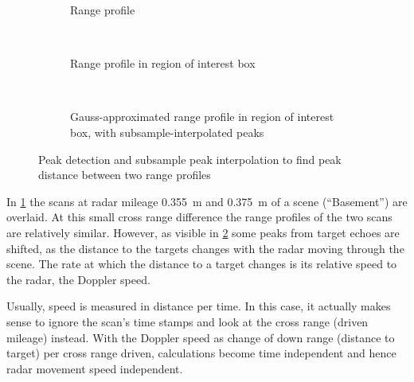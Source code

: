 \begin{figure}[htbp]
    \centering
    \begin{subfigure}[t]{\textwidth}
        \def\svgscale{1}
        
        \caption{Range profile}
        \label{fig:explain_peak_gradient_1}
    \end{subfigure}\bigskip\\
    \begin{subfigure}[t]{\textwidth}
        \def\svgscale{1}
        
        \caption{Range profile in region of interest box}
        \label{fig:explain_peak_gradient_2}
    \end{subfigure}\bigskip\\
    \begin{subfigure}[t]{\textwidth}
        \def\svgscale{1}
        
        \caption{Gauss-approximated range profile in region of interest box, with subsample-interpolated peaks}
        \label{fig:explain_peak_gradient_3}
    \end{subfigure}\bigskip
    \caption{Peak detection and subsample peak interpolation to find peak distance between two range profiles}
    \label{fig:fig_explain_peak_gradient}
\end{figure}

In \cref{fig:explain_peak_gradient_1} the scans at radar mileage \SI{0.355}{m} and \SI{0.375}{m} of a scene (``Basement'') are overlaid. At this small cross range difference the range profiles of the two scans are relatively similar. However, as visible in \cref{fig:explain_peak_gradient_2} some peaks from target echoes are shifted, as the distance to the targets changes with the radar moving through the scene. The rate at which the distance to a target changes is its relative speed to the radar, the Doppler speed.

Usually, speed is measured in distance per time. In this case, it
actually makes sense to ignore the scan's time stamps and look at the
cross range (driven mileage) instead. With the Doppler speed as change
of down range (distance to target) per cross range driven, calculations
become time independent and hence radar movement speed independent.


